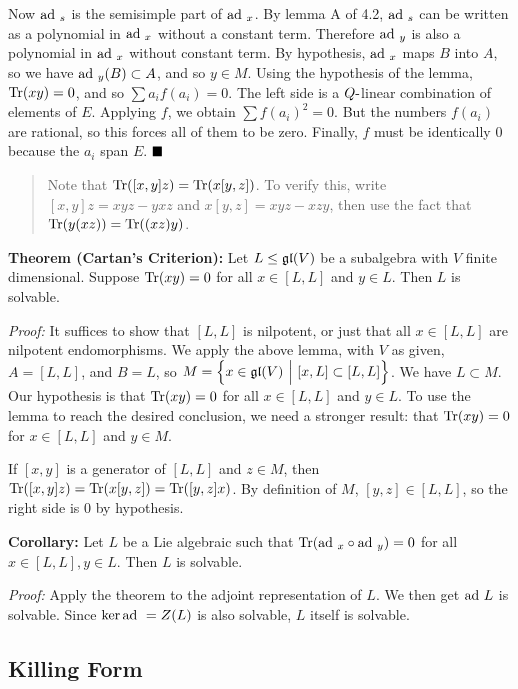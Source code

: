 Now \(\mathrm{ad}~_s\) is the semisimple part of \(\mathrm{ad}~_x\). By lemma A of 4.2,
\(\mathrm{ad}~_s\) can be written as a polynomial in \(\mathrm{ad}~_x\) without a constant
term. Therefore \(\mathrm{ad}~_y\) is also a polynomial in \(\mathrm{ad}~_x\) without
constant term. By hypothesis, \(\mathrm{ad}~_x\) maps \(B\) into \(A\), so we
have \(\mathrm{ad}~_y(B) \subset A\), and so \(y\in M\). Using the hypothesis of
the lemma, \(\mathrm{Tr}(xy) = 0\), and so \(\sum a_i f(a_i) = 0\). The left
side is a \(Q{\hbox{-}}\)linear combination of elements of \(E\). Applying
\(f\), we obtain \(\sum f(a_i)^2 = 0\). But the numbers \(f(a_i)\) are
rational, so this forces all of them to be zero. Finally, \(f\) must be
identically 0 because the \(a_i\) span \(E\). \(\qed\)

\begin{quote}
Note that \(\mathrm{Tr}([x,y]z) = \mathrm{Tr}(x [y, z])\). To verify this, write
\([x,y]z = xyz - yxz\) and \(x[y,z] = xyz - xzy\), then use the fact
that \(\mathrm{Tr}(y(xz)) = \mathrm{Tr}((xz)y)\).
\end{quote}

\textbf{Theorem (Cartan's Criterion):} Let \(L \leq {\mathfrak{gl}}(V)\) be a
subalgebra with \(V\) finite dimensional. Suppose \(\mathrm{Tr}(xy) = 0\) for
all \(x \in [L, L]\) and \(y\in L\). Then \(L\) is solvable.

\emph{Proof:} It suffices to show that \([L, L]\) is nilpotent, or just
that all \(x\in [L, L]\) are nilpotent endomorphisms. We apply the above
lemma, with \(V\) as given, \(A = [L, L]\), and \(B = L\), so
\(M = \left\{{x\in{\mathfrak{gl}}(V){~\mathrel{\Big|}~} [x, L] \subset [L, L]}\right\}\). We have
\(L \subset M\). Our hypothesis is that \(\mathrm{Tr}(xy) = 0\) for all
\(x\in [L, L]\) and \(y\in L\). To use the lemma to reach the desired
conclusion, we need a stronger result: that \(\mathrm{Tr}(xy) = 0\) for
\(x\in [L, L]\) and \(y\in M\).

If \([x,y]\) is a generator of \([L, L]\) and \(z\in M\), then
\(\mathrm{Tr}([x, y]z) = \mathrm{Tr}(x[y,z]) = \mathrm{Tr}([y,z]x)\). By definition of \(M\),
\([y, z] \in [L, L]\), so the right side is 0 by hypothesis.

\textbf{Corollary:} Let \(L\) be a Lie algebraic such that
\(\mathrm{Tr}(\mathrm{ad}~_x \circ \mathrm{ad}~_y) = 0\) for all \(x\in [L, L], y\in L\). Then
\(L\) is solvable.

\emph{Proof:} Apply the theorem to the adjoint representation of \(L\).
We then get \(\mathrm{ad}~ L\) is solvable. Since \(\ker \mathrm{ad}~ = Z(L)\) is also
solvable, \(L\) itself is solvable.

\hypertarget{killing-form}{%
\subsection{Killing Form}\label{killing-form}}

